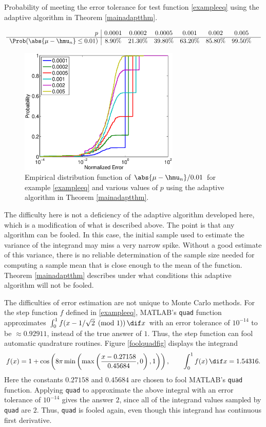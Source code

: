 \documentclass[graybox]{svmult}
\begin{document}
\begin{table}
\caption{Probability of meeting the error tolerance for test function \eqref{exampleeq} using the adaptive algorithm in Theorem \ref{mainadaptthm}. \label{stepfunexamptable}}
\[
\begin{array}{r|ccccccccccc}
p &     0.0001 &   0.0002 &   0.0005 &    0.001 &    0.002 &    0.005 & \\ 
\hline
\Prob(\abs{\mu-\hmu_n} \le 0.01)  &    8.90\% &    21.30\% &    39.80\% &    63.20\% &    85.80\% &    99.50\% & \\ 
\end{array}
\]
\end{table}

\begin{figure}
\centering
\includegraphics[width=3in]{NormalErrFig.eps}
\caption{Empirical distribution function of $\abs{\mu-\hmu_n}/0.01$ for example \eqref{exampleeq} and  various values of $p$ using the adaptive algorithm in Theorem \ref{mainadaptthm}. \label{normalerrfig}}
\end{figure}

The difficulty here is not a deficiency of the adaptive algorithm developed here, which is a modification of what is described above.  The point is that any algorithm can be fooled.  In this case, the initial sample used to estimate the variance of the integrand may miss a very narrow spike.  Without a good estimate of this variance, there is no reliable determination of the sample size needed for computing a sample mean that is close enough to the mean of the function.  Theorem \ref{mainadaptthm} describes under what conditions this adaptive algorithm will not be fooled.

The difficulties of error estimation are not unique to Monte Carlo methods. For the step function $f$ defined in \eqref{exampleeq}, MATLAB's {\tt quad} function approximates $\int_0^1 f(x - 1/\sqrt{2} \pmod 1) \, \dif x$  with an error tolerance of $10^{-14}$ to be $\approx 0.92911$, instead of the true answer of $1$.  Thus, the step function can fool automatic quadrature routines.  Figure \ref{foolquadfig} displays the integrand
\[
f(x) = 1+\cos\left(8\pi\min\left(\max\left(\frac{x-0.27158}{0.45684},0\right),1\right)\right), \qquad \int_0^1 f(x) \, \dif x = 1.54316.
\]
Here the constants $0.27158$ and $0.45684$ are chosen to fool MATLAB's {\tt quad} function.  Applying {\tt quad} to approximate the above integral with an error tolerance of $10^{-14}$ gives the answer $2$, since all of the integrand values sampled by {\tt quad} are $2$.  Thus, {\tt quad} is fooled again, even though this integrand has continuous first derivative.  
\end{document}
